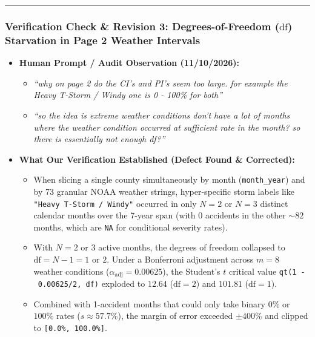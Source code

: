 \documentclass[
  letterpaper,
  DIV=11,
  numbers=noendperiod]{scrartcl}
\providecommand{\tightlist}{%
  \setlength{\itemsep}{0pt}\setlength{\parskip}{0pt}}
\begin{document}
\begin{center}\rule{0.5\linewidth}{0.5pt}\end{center}

\subsubsection{\texorpdfstring{Verification Check \& Revision 3:
Degrees-of-Freedom (\(\text{df}\)) Starvation in Page 2 Weather
Intervals}{Verification Check \& Revision 3: Degrees-of-Freedom (\textbackslash text\{df\}) Starvation in Page 2 Weather Intervals}}\label{verification-check-revision-3-degrees-of-freedom-textdf-starvation-in-page-2-weather-intervals}

\begin{itemize}
\tightlist
\item
  \textbf{Human Prompt / Audit Observation (11/10/2026):}

  \begin{itemize}
  \tightlist
  \item
    \emph{``why on page 2 do the CI's and PI's seem too large. for
    example the Heavy T-Storm / Windy one is 0 - 100\% for both''}
  \item
    \emph{``so the idea is extreme weather conditions don't have a lot
    of months where the weather condition occurred at sufficient rate in
    the month? so there is essentially not enough df?''}
  \end{itemize}
\item
  \textbf{What Our Verification Established (Defect Found \&
  Corrected):}

  \begin{itemize}
  \tightlist
  \item
    When slicing a single county simultaneously by month
    (\texttt{month\_year}) and by 73 granular NOAA weather strings,
    hyper-specific storm labels like \texttt{"Heavy\ T-Storm\ /\ Windy"}
    occurred in only \(N = 2\) or \(N = 3\) distinct calendar months
    over the 7-year span (with \(0\) accidents in the other \(\sim 82\)
    months, which are \texttt{NA} for conditional severity rates).
  \item
    With \(N = 2\) or \(3\) active months, the degrees of freedom
    collapsed to \(\text{df} = N - 1 = 1\) or \(2\). Under a Bonferroni
    adjustment across \(m = 8\) weather conditions
    (\(\alpha_{\text{adj}} = 0.00625\)), the Student's \(t\) critical
    value \texttt{qt(1\ -\ 0.00625/2,\ df)} exploded to \(12.64\)
    (\(\text{df} = 2\)) and \(101.81\) (\(\text{df} = 1\)).
  \item
    Combined with 1-accident months that could only take binary \(0\%\)
    or \(100\%\) rates (\(s \approx 57.7\%\)), the margin of error
    exceeded \(\pm 400\%\) and clipped to
    \texttt{{[}0.0\%,\ 100.0\%{]}}.
  \end{itemize}
\end{itemize}
\end{document}
